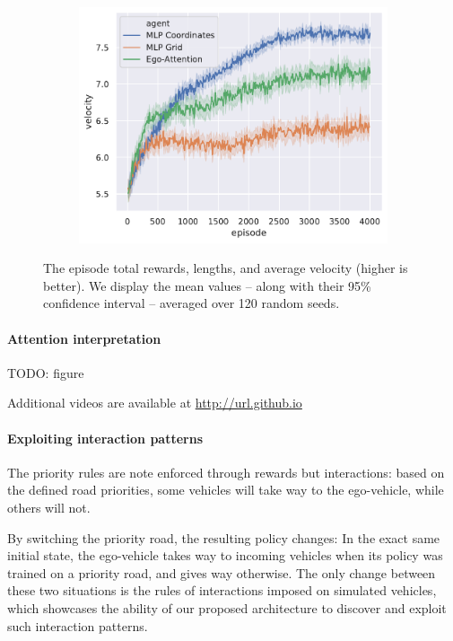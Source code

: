 \documentclass{article}
\begin{document}
\begin{figure}[htp]
\begin{subfigure}[t]{.49\linewidth}
		\centering\includegraphics[width=\linewidth]{img/velocity}
	\end{subfigure}
 \caption{The episode total rewards, lengths, and average velocity (higher is better). We display the mean values -- along with their 95\% confidence interval -- averaged over 120 random seeds.}
 \label{fig:results}
\end{figure}

\paragraph{Attention interpretation}

TODO: figure

Additional videos are available at \url{http://url.github.io}

\paragraph{Exploiting interaction patterns}
The priority rules are note enforced through rewards but interactions: based on the defined road priorities, some vehicles will take way to the ego-vehicle, while others will not.

By switching the priority road, the resulting policy changes: In the exact same initial state, the ego-vehicle takes way to incoming vehicles when its policy was trained on a priority road, and gives way otherwise. The only change between these two situations is the rules of interactions imposed on simulated vehicles, which showcases the ability of our proposed architecture to discover and exploit such interaction patterns.
\end{document}
